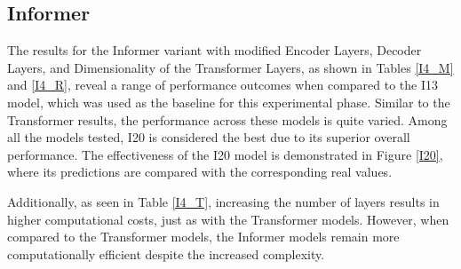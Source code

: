 \subsection{Informer}
The results for the Informer variant with modified Encoder Layers, Decoder Layers, and Dimensionality of the Transformer Layers, as shown in Tables \ref{I4_M} and \ref{I4_R}, reveal a range of performance outcomes when compared to the I13 model, which was used as the baseline for this experimental phase. Similar to the Transformer results, the performance across these models is quite varied. Among all the models tested, I20 is considered the best due to its superior overall performance. The effectiveness of the I20 model is demonstrated in Figure \ref{I20}, where its predictions are compared with the corresponding real values.

Additionally, as seen in Table \ref{I4_T}, increasing the number of layers results in higher computational costs, just as with the Transformer models. However, when compared to the Transformer models, the Informer models remain more computationally efficient despite the increased complexity.




